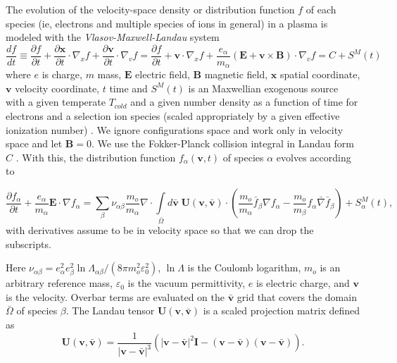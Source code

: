 \documentclass[12pt]{siamart}
\begin{document}
The evolution of the velocity-space density or
distribution function $f$ of each species (ie, electrons and multiple
species of ions in general) in a plasma is modeled with the {\it Vlasov-Maxwell-Landau} system
\begin{equation*}
\frac{df}{dt}\equiv
\frac{\partial f}{\partial t} + \frac{\partial\bm x}{\partial t}
\cdot \nabla_x f+ \frac{\partial\bm v}{\partial t} \cdot \nabla_v f
= \frac{\partial f}{\partial t} + {\bm v} \cdot \nabla_x f+
\frac{e_{\alpha}}{m_{\alpha}}\left( {\bm E} + {\bm v} \times {\bm B} \right) \cdot
\nabla_v f = C + S^M\left(t\right)
\end{equation*}
where $e$ is charge, $m$ mass, ${\bm E} $ electric field, ${\bm B}$
magnetic field, ${\bm x}$ spatial coordinate, ${\bm v}$ velocity
coordinate,  $t$ time and $S^M\left(t\right)$ is an Maxwellian exogenous source with a given temperate $T_{cold}$ and a given number density as a function of time for electrons and a selection ion species (scaled appropriately by a given effective ionization number) \cite{Vlasov1968}.
We ignore configurations space and work only in velocity space and let ${\bm B=0}$.
We use  the Fokker-Planck collision integral in Landau form $C$ \cite{landau1936kinetic}.
With this, the distribution function $f_{\alpha}(\bm{v},t)$ of species $\alpha$ evolves according to

\begin{equation*}
\label{eq:landau1}
\frac{\partial f_{\alpha}}{\partial t} + \frac{e_{\alpha}}{m_{\alpha}} {\bm E} \cdot \nabla f_{\alpha} = 
\sum_{\beta}\nu_{\alpha\beta}\frac{m_o}{m_{\alpha}}\nabla \cdot\int \limits_{\bar\Omega} d\bm{\bar{v}}\;\mathbf{U}(\bm{v},\bm{\bar{v}})\cdot\left(\frac{m_o}{m_{\alpha}}\bar{f}_{\beta}\nabla f_{\alpha} - \frac{m_o}{m_{\beta}}f_{\alpha} \bar \nabla \bar{f}_{\beta}\right) + S^M_\alpha\left(t\right),
\end{equation*}
with derivatives assume to be in velocity space so that we can drop the subscripts.

Here
$\nu_{\alpha\beta}=e_{\alpha}^2e_{\beta}^2\ln\Lambda_{\alpha\beta}/(8\pi m_o^2\varepsilon_0^2)$, $\ln\Lambda$ is the Coulomb logarithm, $m_o$
is an arbitrary reference mass, $\varepsilon_0$ is the vacuum
permittivity, $e$ is electric charge, and $\bm{v}$ is the velocity. Overbar terms are evaluated on the $\bm{\bar{v}}$ grid that covers the domain $\bar\Omega$ of species $\beta$.  The
Landau tensor $\mathbf{U}(\bm{v},\bm{\bar{v}})$ is a scaled projection
matrix defined as
\begin{equation*}
\label{eq:landau_tensor}
\mathbf{U}(\bm{v},\bm{\bar{v}})=\frac{1}{\lvert\bm{v}-\bm{\bar{v}}\rvert^3}\left(\lvert\bm{v}-\bm{\bar{v}}\rvert^2\mathbf{I}-(\bm{v}-\bm{\bar{v}})(\bm{v}-\bm{\bar{v}})\right).
\end{equation*}
\end{document}
